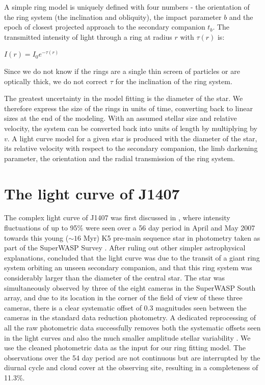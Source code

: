 \documentclass{emulateapj}
\newcommand{\taur}{\tau(r)}
\begin{document}
A simple ring model is uniquely defined with four numbers - the
orientation of the ring system (the inclination and obliquity), the
impact parameter $b$ and the epoch of closest projected approach to
the secondary companion $t_b$.
The transmitted intensity of light through a ring at radius $r$ with
$\taur$ is:

$I(r) = I_0 e^{-\taur}$

Since we do not know if the rings are a single thin screen of
particles or are optically thick, we do not correct $\tau$ for the
inclination of the ring system.

The greatest uncertainty in the model fitting is the diameter of the
star.
We therefore express the size of the rings in units of time,
converting back to linear sizes at the end of the modeling.
With an assumed stellar size and relative velocity, the system can be
converted back into units of length by multiplying by $v$.
A light curve model for a given star is produced with the diameter of
the star, its relative velocity with respect to the secondary
companion, the limb darkening parameter, the orientation and the
radial transmission of the ring system.

\section{The light curve of J1407}
\label{sec:j1407}

The complex light curve of J1407 was first discussed in
\citet{Mamajek12}, where intensity fluctuations of up to 95\% were
seen over a 56 day period in April and May 2007 towards this young
($\sim 16$ Myr) K5 pre-main sequence star in photometry taken as part
of the SuperWASP Survey \citep{Pollacco06,Butters10}.
After ruling out other simpler astrophysical explanations,
\citet{Mamajek12} concluded that the light curve was due to the
transit of a giant ring system orbiting an unseen secondary companion,
and that this ring system was considerably larger than the diameter of
the central star.
The star was simultaneously observed by three of the eight cameras in
the SuperWASP South array, and due to its location in the corner of
the field of view of these three cameras, there is a clear systematic
offset of 0.3 magnitudes seen between the cameras in the standard data
reduction photometry.
A dedicated reprocessing of all the raw photometric data successfully
removes both the systematic offsets seen in the light curves and also
the much smaller amplitude stellar variability \citep{vanWerkhoven14}.
We use the cleaned photometric data \citep{vanWerkhoven14} as the input
for our ring fitting model.
The observations over the 54 day period are not continuous but are
interrupted by the diurnal cycle and cloud cover at the observing site,
resulting in a completeness of 11.3\%.
\end{document}
